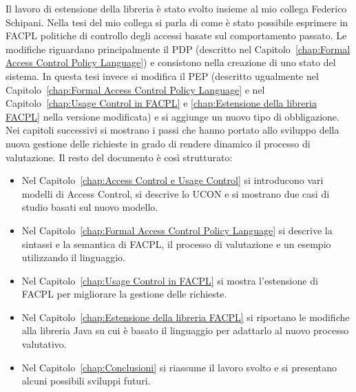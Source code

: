 Il lavoro di estensione della libreria è stato svolto insieme al mio collega Federico Schipani. Nella tesi del
mio collega si parla di come è stato possibile esprimere in FACPL politiche di controllo degli accessi basate
sul comportamento passato. Le modifiche riguardano principalmente il \ac{PDP} (descritto nel Capitolo~\ref{chap:Formal Access Control Policy Language})
e consistono nella creazione di uno stato del sistema. In questa tesi invece si modifica il \ac{PEP}
(descritto ugualmente nel Capitolo~\ref{chap:Formal Access Control Policy Language}
e nel Capitolo~\ref{chap:Usage Control in FACPL} e \ref{chap:Estensione della libreria FACPL} nella versione modificata)
e si aggiunge un nuovo tipo di obbligazione.
Nei capitoli successivi si mostrano i passi che hanno portato allo sviluppo della nuova gestione delle richieste
in grado di rendere dinamico il processo di valutazione.
\vspace{5mm}
\newline
Il resto del documento è così strutturato:
\begin{itemize}
  \renewcommand\labelitemi{--}
  \item Nel Capitolo~\ref{chap:Access Control e Usage Control}
  si introducono vari modelli di Access Control, si descrive lo \ac{UCON} e si mostrano due casi di studio basati sul nuovo modello.
  \item Nel Capitolo~\ref{chap:Formal Access Control Policy Language}
  si descrive la sintassi e la semantica di \ac{FACPL}, il processo di valutazione e un esempio utilizzando il linguaggio.
  \item Nel Capitolo~\ref{chap:Usage Control in FACPL}
  si mostra l'estensione di \ac{FACPL} per migliorare la gestione delle richieste.
  \item Nel Capitolo~\ref{chap:Estensione della libreria FACPL}
  si riportano le modifiche alla libreria Java su cui è basato il linguaggio per adattarlo al nuovo processo valutativo.
  \item Nel Capitolo~\ref{chap:Conclusioni}
  si riassume il lavoro svolto e si presentano alcuni possibili sviluppi futuri.
\end{itemize}
